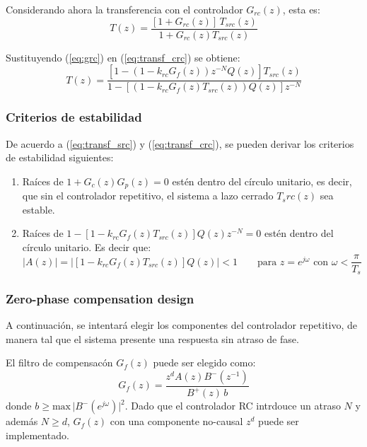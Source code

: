 \documentclass[titlepage, 12pt]{article}
\begin{document}
Considerando ahora la transferencia con el controlador $G_{rc}(z)$, esta es:
\begin{equation}
\label{eq:transf_crc}
    T(z) = \frac{[1+G_{rc}(z)]\,T_{src}(z)}{1+G_{rc}(z)T_{src}(z)}
\end{equation}

Sustituyendo (\ref{eq:grc}) en (\ref{eq:transf_crc}) se obtiene:
\begin{equation}
\label{eq:transf_crc_completa}
    T(z) = \frac{ [1-(1-k_{rc}G_f(z))z^{-N}Q(z)]T_{src}(z) }{ 1-[(1-k_{rc}G_f(z)T_{src}(z))Q(z)]z^{-N} }
\end{equation}

\subsubsection{Criterios de estabilidad}
De acuerdo a (\ref{eq:transf_src}) y (\ref{eq:transf_crc}), se pueden derivar los criterios de estabilidad siguientes:
\begin{enumerate}
    \item Raíces de $1+G_c(z)G_p(z)=0$ estén dentro del círculo unitario, es decir, que sin el controlador repetitivo, el sistema a lazo cerrado $T_src(z)$ sea estable. 
    \item Raíces de $1-[1-k_{rc}G_f(z)T_{src}(z)]Q(z)z^{-N}=0$ estén dentro del círculo unitario. Es decir que:
    \begin{equation}
    \label{eq:a1}
        \big\lvert A(z)\big\rvert = \big\lvert [1-k_{rc}G_f(z)T_{src}(z)]Q(z)\big\rvert <1 \qquad \text{para $z=e^{j\omega}$ con } \omega < \frac{\pi}{T_s}
    \end{equation}
\end{enumerate}

\subsubsection{Zero-phase compensation design}
A continuación, se intentará elegir los componentes del controlador repetitivo, de manera tal que el sistema presente una respuesta sin atraso de fase.

El filtro de compensacón $G_f(z)$ puede ser elegido como:
\begin{equation}
\label{eq:Gf1}
    G_f(z) = \frac{z^dA(z)B^-(z^{-1})}{B^+(z)\,b}
\end{equation}
donde $b\geq \text{max} \, \big\lvert B^-(e^{j\omega})\big\rvert^2$. Dado que el controlador RC intrdouce un atraso $N$ y además $N \geq d$, $G_f(z)$ con una componente no-causal $z^d$ puede ser implementado.
\end{document}
